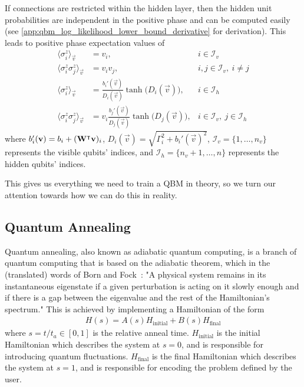 If connections are restricted within the hidden layer, then the hidden unit probabilities are independent in the positive phase and can be computed easily (see \cref{app:qbm_log_likelihood_lower_bound_derivative} for derivation).
This leads to positive phase expectation values of
\begin{align}
    \langle \sigma_i^z \rangle_\vec{v}
        &= v_i,
        & i \in \mathcal{I}_v \\
    \langle \sigma_i^z \sigma_j^z \rangle_{\vec{v}}
        &= v_i v_j,
        & i, j \in \mathcal{I}_v, \ i \ne j \\
    \langle \sigma_i^z \rangle_\vec{v}
        &= \frac{b_i'(\vec{v})}{D_i(\vec{v})} \tanh\big(D_i(\vec{v})\big),
        & i \in \mathcal{I}_h \\
    \langle \sigma_i^z \sigma_j^z \rangle_{\vec{v}}
        &= v_i \frac{b_j'(\vec{v})}{D_j(\vec{v})} \tanh\big(D_j(\vec{v})\big),
        & i \in \mathcal{I}_v, \ j \in \mathcal{I}_h
\end{align}
where \( b_i'(\mathbf{v}) = b_i + (\mathbf{W}^\intercal\mathbf{v})_i \), \( D_i(\vec{v}) = \sqrt{\Gamma_i^2 + b_i'(\vec{v})^2} \), \( \mathcal{I}_v = \{1, \dots, n_v\} \) represents the visible qubits' indices, and \( \mathcal{I}_h = \{n_v + 1, \dots, n\} \) represents the hidden qubits' indices.

This gives us everything we need to train a QBM in theory, so we turn our attention towards how we can do this in reality.

\subsection{Quantum Annealing}
Quantum annealing, also known as adiabatic quantum computing, is a branch of quantum computing that is based on the adiabatic theorem, which in the (translated) words of Born and Fock~\cite{born_fock_1928}:
"A physical system remains in its instantaneous eigenstate if a given perturbation is acting on it slowly enough and if there is a gap between the eigenvalue and the rest of the Hamiltonian's spectrum."
This is achieved by implementing a Hamiltonian of the form~\cite{qc_lecture_notes}
\begin{align}
    H(s) = A(s) H_{\text{initial}} + B(s) H_{\text{final}}
\end{align}
where \( s = t / t_a \in [0, 1] \) is the relative anneal time.
\( H_{\text{initial}} \) is the initial Hamiltonian which describes the system at \( s = 0 \), and is responsible for introducing quantum fluctuations.
\( H_{\text{final}} \) is the final Hamiltonian which describes the system at \( s = 1 \), and is responsible for encoding the problem defined by the user.

